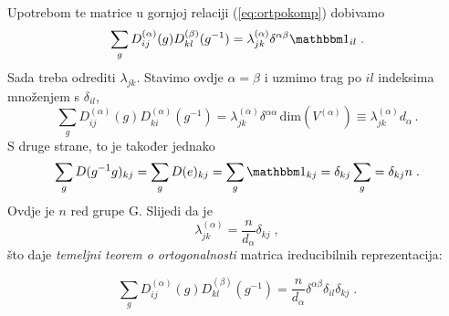 Upotrebom te matrice u gornjoj relaciji (\ref{eq:ortpokomp})  dobivamo
\begin{equation}
\sum_g D^{(\alpha)}_{ij}(g) D^{(\beta)}_{kl}(g^{-1}) = 
 \lambda^{(\alpha)}_{jk} \delta^{\alpha\beta} \Eins_{il} \;.
\end{equation}
Sada treba odrediti $\lambda_{jk}$. 
Stavimo ovdje $\alpha =\beta$ i uzmimo trag po $il$ indeksima
množenjem s $\delta_{il}$,
\begin{displaymath}
\sum_g D^{(\alpha)}_{ij}(g) D^{(\alpha)}_{ki}(g^{-1}) = 
 \lambda^{(\alpha)}_{jk} \delta^{\alpha\alpha}\, \textrm{dim}(V^{(\alpha)})
 \equiv \lambda^{(\alpha)}_{jk} d_{\alpha} \,.
\end{displaymath}
S druge strane, to je također jednako
\begin{displaymath}
 \sum_g D(g^{-1}g)_{kj}=\sum_g D(e)_{kj}= \sum_g \Eins_{kj} = \delta_{kj} \sum_g 
 = \delta_{kj} n \;.
\end{displaymath}
Ovdje je $n$ red grupe G.
Slijedi da je
\begin{displaymath}
\lambda^{(\alpha)}_{jk}= \frac{n}{d_{\alpha}}\delta_{kj} \;,
\end{displaymath}
što daje \emph{temeljni teorem o ortogonalnosti} matrica ireducibilnih
reprezentacija: 
\begin{teorem}
\begin{displaymath}
\sum_g D^{(\alpha)}_{ij}(g) D^{(\beta)}_{kl}(g^{-1}) =
 \frac{n}{d_{\alpha}}\delta^{\alpha\beta}\delta_{il}\delta_{kj} \;.
\end{displaymath}
\label{tm:ortogonalnost}
\end{teorem}

